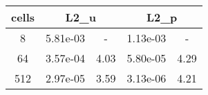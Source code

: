 \documentclass[10pt]{report}
\begin{document}
\begin{table}[H]
\begin{center}
\begin{tabular}{|c|c|c|c|c|} \hline
cells & 
\multicolumn{2}{|c|}{L2_u} & 
\multicolumn{2}{|c|}{L2_p}\\ \hline
8 & 5.81e-03 & - & 1.13e-03 & -\\ \hline
64 & 3.57e-04 & 4.03 & 5.80e-05 & 4.29\\ \hline
512 & 2.97e-05 & 3.59 & 3.13e-06 & 4.21\\ \hline
\end{tabular}
\end{center}
\end{table}
\end{document}
